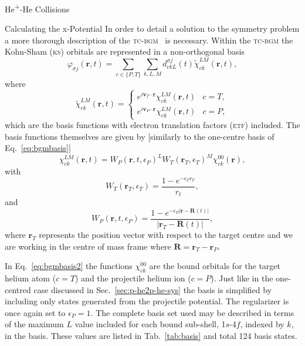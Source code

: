 \documentclass[letterpaper, 11 pt]{report}
\begin{document}
\begin{chapter}{\texorpdfstring{He\textsuperscript{+}}{He+}-He Collisions \label{chap:hephe}}
\begin{section}{Calculating the x-Potential \label{sec:pot}}
      In order to detail a solution to the symmetry problem a more thorough description of the
      \textsc{tc-bgm}~\cite{tcbgm} is necessary. Within the \textsc{tc-bgm} the Kohn-Sham (\textsc{ks})
      orbitals are represented in a non-orthogonal basis
      \begin{equation} \label{eq:bgmexp}
         \varphi_{\sigma j}(\mathbf{r},t) = \sum\limits_{c \in \{P, T\}} \sum\limits_{k, L, M}
                               d_{c k L}^{\sigma j}(t) \tilde{\chi}^{LM}_{c k}(\mathbf{r},t),
      \end{equation}
      where
      \begin{equation} \label{eq:etfbasis}
         \tilde{\chi}^{L M}_{ck}(\mathbf{r},t) =
            \begin{cases}
               e^{i \mathbf{v}_T \cdot \mathbf{r}} {\chi}^{L M}_{c k}(\mathbf{r},t) & c = T, \\[2ex]
               e^{i \mathbf{v}_P \cdot \mathbf{r}} {\chi}^{L M}_{c k}(\mathbf{r},t) & c = P,
            \end{cases}
      \end{equation}
      which are the basis functions with electron translation factors (\textsc{etf}) included. The basis
      functions themselves are given by [similarly to the one-centre basis of Eq.~\eqref{eq:bgmbasis}]
      \begin{equation} \label{eq:bgmbasis2}
         \chi^{LM}_{ck} (\mathbf{r},t)
         = W_P( \mathbf{r},t, \epsilon_P)^L W_T(\mathbf{r}_T,\epsilon_T)^M \chi^{00}_{ck}(\mathbf{r}),
      \end{equation}
      with
      \begin{equation}
         W_T(\mathbf{r}_T,\epsilon_T) = \frac{1 - e^{-\epsilon_T r_T}}{r_t},
      \end{equation}
      and
      \begin{equation}
         W_P (\mathbf{r},t,\epsilon_P)
         = \frac{1 - e^{-\epsilon_P|\mathbf{r} - \mathbf{R}(t)|}}{|\mathbf{r}_T - \mathbf{R}(t)|},
      \end{equation}
      where $\mathbf{r}_T$ represents the position vector with respect to the target centre and we are
      working in the centre of mass frame where $\mathbf{R} = \mathbf{r}_T - \mathbf{r}_P$.

      In Eq.~\eqref{eq:bgmbasis2} the functions $\chi^{00}_{ck}$ are the bound orbitals for the target
      helium atom ($c = T$) and the projectile helium ion ($c = P$). Just like in the one-centred case
      discussed in Sec.~\ref{sec:p-he2p-he-sys} the basis is simplified by including only states
      generated from the projectile potential. The regularizer is once again set to $\epsilon_P = 1$.
      The complete basis set used may be described in terms of the maximum $L$ value included for each
      bound sub-shell, 1$s$-4$f$, indexed by $k$, in the basis. These values are listed in
      Tab.~\ref{tab:basis} and total 124 basis states.


\end{section}
\end{chapter}
\end{document}
